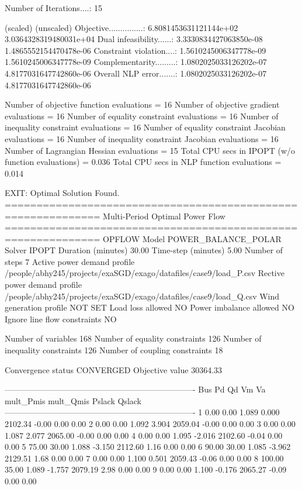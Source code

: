 Number of Iterations....: 15

                                   (scaled)                 (unscaled)
Objective...............:   6.8081453631121144e+02    3.0364328319480031e+04
Dual infeasibility......:   3.3330834427063850e-08    1.4865552154470478e-06
Constraint violation....:   1.5610245006347778e-09    1.5610245006347778e-09
Complementarity.........:   1.0802025033126202e-07    4.8177031647742860e-06
Overall NLP error.......:   1.0802025033126202e-07    4.8177031647742860e-06


Number of objective function evaluations             = 16
Number of objective gradient evaluations             = 16
Number of equality constraint evaluations            = 16
Number of inequality constraint evaluations          = 16
Number of equality constraint Jacobian evaluations   = 16
Number of inequality constraint Jacobian evaluations = 16
Number of Lagrangian Hessian evaluations             = 15
Total CPU secs in IPOPT (w/o function evaluations)   =      0.036
Total CPU secs in NLP function evaluations           =      0.014

EXIT: Optimal Solution Found.
=============================================================
Multi-Period Optimal Power Flow
=============================================================
OPFLOW Model                        POWER_BALANCE_POLAR
Solver                              IPOPT
Duration (minutes)                  30.00
Time-step (minutes)                 5.00 
Number of steps                     7
Active power demand profile         /people/abhy245/projects/exaSGD/exago/datafiles/case9/load_P.csv
Rective power demand profile        /people/abhy245/projects/exaSGD/exago/datafiles/case9/load_Q.csv
Wind generation profile             NOT SET
Load loss allowed                   NO
Power imbalance allowed             NO
Ignore line flow constraints        NO

Number of variables                 168
Number of equality constraints      126
Number of inequality constraints    126
Number of coupling constraints      18

Convergence status                  CONVERGED
Objective value                     30364.33

----------------------------------------------------------------------
Bus        Pd      Qd      Vm      Va      mult_Pmis      mult_Qmis      Pslack         Qslack        
----------------------------------------------------------------------
1         0.00    0.00   1.089   0.000      2102.34        -0.00         0.00         0.00
2         0.00    0.00   1.092   3.904      2059.04        -0.00         0.00         0.00
3         0.00    0.00   1.087   2.077      2065.00        -0.00         0.00         0.00
4         0.00    0.00   1.095  -2.016      2102.60        -0.04         0.00         0.00
5        75.00   30.00   1.088  -3.150      2112.60         1.16         0.00         0.00
6        90.00   30.00   1.085  -3.962      2129.51         1.68         0.00         0.00
7         0.00    0.00   1.100   0.501      2059.43        -0.06         0.00         0.00
8       100.00   35.00   1.089  -1.757      2079.19         2.98         0.00         0.00
9         0.00    0.00   1.100  -0.176      2065.27        -0.09         0.00         0.00

